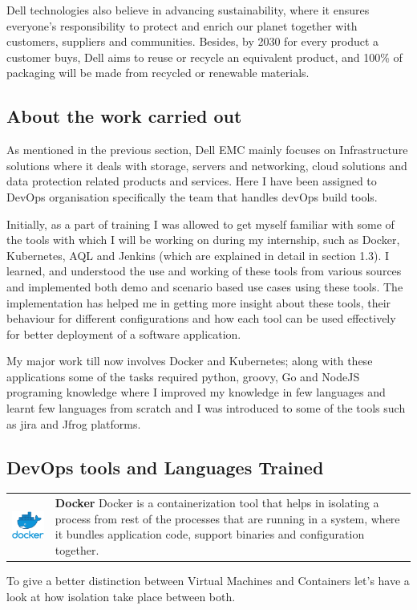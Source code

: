 \documentclass[12pt]{article}
\begin{document}
Dell technologies also believe in advancing sustainability, where it ensures everyone’s responsibility to protect and enrich our planet together with customers, suppliers and communities. Besides, by 2030 for every product a customer buys, Dell aims to reuse or recycle an equivalent product, and 100\% of packaging will be made from recycled or renewable materials.	
	
	\subsection{About the work carried out}
	
As mentioned in the previous section, Dell EMC mainly focuses on Infrastructure solutions where it deals with storage, servers and networking, cloud solutions and data protection related products and services. Here I have been assigned to DevOps organisation specifically the team that handles devOps build tools.

Initially, as a part of training I was allowed to get myself familiar with some of the tools with which I will be working on during my internship, such as Docker, Kubernetes, AQL and Jenkins (which are explained in detail in section 1.3). I learned, and understood the use and working of these tools from various sources and implemented both demo and scenario based use cases using these tools. The implementation has helped me in getting more insight about these tools, their behaviour for different configurations and how each tool can be used effectively for better deployment of a software application.

My major work till now involves Docker and Kubernetes; along with these applications some of the tasks required python, groovy, Go and NodeJS programing knowledge where I improved my knowledge in few languages and learnt few languages from scratch and I was introduced to some of the tools such as jira and Jfrog platforms.	
	
	\subsection{DevOps tools and Languages Trained}

\begin{tabular}{C{3.8cm}  L{10.7cm}}
        \includegraphics[width=3.7cm]{docker.png} & {\Large{\textbf{Docker}}} \newline 
        Docker is a containerization tool that helps in isolating a process from rest of the processes that are running in a system, where it bundles application code, support binaries and configuration together.
\end{tabular}	
To give a better distinction between Virtual Machines and Containers let’s have a look at how isolation take place between both.	
\end{document}
